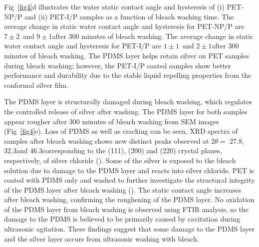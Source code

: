 \documentclass[10pt,letterpaper]{article}
\begin{document}
Fig~\ref{fig4}d illustrates the water static contact angle and hysteresis of (i) PET-NP/P and (ii) PET-I/P samples as a function of bleach washing time. The average change in static water contact angle and hysteresis for %
PET-NP/P are $7 \pm 2$\degree~and $9 \pm 1$\degree after 300 minutes of bleach washing. 
The average change in static water contact angle and hysteresis for 
PET-I/P are $1 \pm 1$\degree~and $2 \pm 1$\degree after 300 minutes of bleach washing. 
The PDMS layer helps retain silver on PET samples during bleach washing; however, the PET-I/P coated samples show better performance and durability due to the stable liquid repelling properties from the conformal silver film. 

The PDMS layer is structurally damaged during bleach washing, which regulates the controlled release of silver after washing. The PDMS layer for both samples appear rougher after 300 minutes of bleach washing from SEM images (Fig~\ref{fig4}e). Loss of PDMS as well as cracking can be seen.  
XRD spectra of samples after bleach washing shows new distinct peaks observed at 2$\theta =$ 27.8\degree, 32.3\degree and 46.3\degree corresponding to the (111), (200) and (220) crystal planes, respectively, of silver chloride (). 
Some of the silver is exposed to the bleach solution due to damage to the PDMS layer and reacts into silver chloride. %
PET is coated with PDMS only and washed to further investigate the structural integrity of the PDMS layer after bleach washing (). The static contact angle increases after bleach washing, confirming the roughening of the PDMS layer. No oxidation of the PDMS layer from bleach washing is observed using FTIR analysis, so the damage to the PDMS is believed to be primarily caused by cavitation during ultrasonic agitation. These findings suggest that some damage to the PDMS layer and the silver layer occurs from ultrasonic washing with bleach.   
\end{document}
